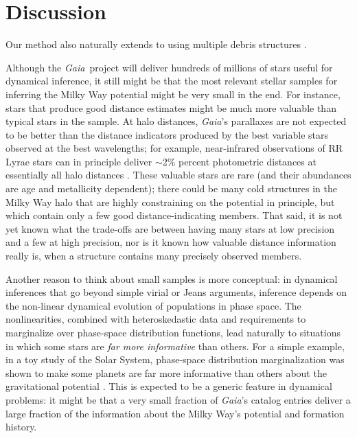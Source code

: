 \documentclass[letterpaper,12pt,preprint]{aastex}
\newcommand{\project}[1]{\textsl{#1}}
\newcommand{\gaia}{\project{Gaia}}
\begin{document}
\section{Discussion}

Our method also naturally extends to using multiple debris structures \citep[see][who illustrate the power of using multiple streams to simultaneously constrain the potential]{deg14}.

Although the \gaia\, project will deliver hundreds of millions of stars useful for dynamical inference,
  it still might be that the most relevant stellar samples for inferring the Milky Way potential might be very small in the end.
For instance, stars that produce good distance estimates might be much more valuable than typical stars in the sample.
At halo distances, \gaia's parallaxes are not expected to be better than the distance indicators produced by the best
  variable stars observed at the best wavelengths; for example, near-infrared observations of RR Lyrae stars
  can in principle deliver $\sim$2\% percent photometric distances at essentially all halo distances \citep{madore12}.
These valuable stars are rare (and their abundances are age and metallicity dependent);
  there could be many cold structures in the Milky Way halo that are highly constraining
  on the potential in principle, but which contain only a few good distance-indicating members.
That said, it is not yet known what the trade-offs are between having many stars at low precision and a few at high precision,
  nor is it known how valuable distance information really is, when a structure contains many precisely observed members.

Another reason to think about small samples is more conceptual:
in dynamical inferences that go beyond simple virial or Jeans arguments,
  inference depends on the non-linear dynamical evolution of populations in phase space.
The nonlinearities, combined with heteroskedastic data and requirements to marginalize over phase-space distribution functions,
  lead naturally to situations in which some stars are \emph{far more informative} than others.
For a simple example, in a toy study of the Solar System,
  phase-space distribution marginalization was shown to make some planets are far more informative than others
  about the gravitational potential \citep{bovy10}.
This is expected to be a generic feature in dynamical problems:
  it might be that a very small fraction of \gaia's catalog entries
  deliver a large fraction of the information about the Milky Way's potential and formation history.
\end{document}
